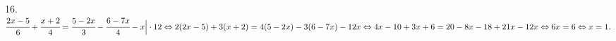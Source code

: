 16. $\cfrac{2x-5}{6}+\cfrac{x+2}{4}=\cfrac{5-2x}{3}-\cfrac{6-7x}{4}-x\Big|\cdot12\Leftrightarrow2(2x-5)+3(x+2)=4(5-2x)-3(6-7x)-12x\Leftrightarrow
4x-10+3x+6=20-8x-18+21x-12x\Leftrightarrow6x=6\Leftrightarrow x=1.$\\
